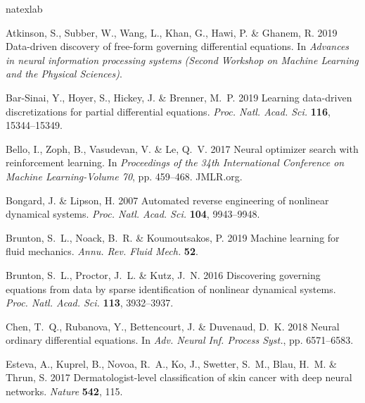 \documentclass{article}
\begin{document}
\begin{thebibliography}{30}
\expandafter\ifx\csname natexlab\endcsname\relax\def\natexlab#1{#1}\fi

{\sc Atkinson, S., Subber, W., Wang, L., Khan, G., Hawi, P. \& Ghanem, R.} 2019
  Data-driven discovery of free-form governing differential equations. In {\em
  Advances in neural information processing systems (Second Workshop on Machine
  Learning and the Physical Sciences)\/}.

{\sc Bar-Sinai, Y., Hoyer, S., Hickey, J. \& Brenner, M.~P.} 2019 Learning
  data-driven discretizations for partial differential equations. {\em
  Proc. Natl. Acad. Sci.\/} {\bf 116},
  15344--15349.

{\sc Bello, I., Zoph, B., Vasudevan, V. \& Le, Q.~V.} 2017 Neural optimizer
  search with reinforcement learning. In {\em Proceedings of the 34th
  International Conference on Machine Learning-Volume 70\/}, pp. 459--468.
  JMLR.org.

{\sc Bongard, J. \& Lipson, H.} 2007 Automated reverse engineering of nonlinear
  dynamical systems. {\em Proc. Natl. Acad. Sci.\/}
  {\bf 104}, 9943--9948.

{\sc Brunton, S.~L., Noack, B.~R. \& Koumoutsakos, P.} 2019 Machine learning
  for fluid mechanics. {\em Annu. Rev. Fluid Mech.\/} {\bf 52}.

{\sc Brunton, S.~L., Proctor, J.~L. \& Kutz, J.~N.} 2016 Discovering governing
  equations from data by sparse identification of nonlinear dynamical systems.
  {\em Proc. Natl. Acad. Sci.\/} {\bf 113},
  3932--3937.

{\sc Chen, T.~Q., Rubanova, Y., Bettencourt, J. \& Duvenaud, D.~K.} 2018 Neural
  ordinary differential equations. In {\em Adv. Neural Inf. Process Syst.\/}, pp. 6571--6583.

{\sc Esteva, A., Kuprel, B., Novoa, R.~A., Ko, J., Swetter, S.~M., Blau, H.~M.
  \& Thrun, S.} 2017 Dermatologist-level classification of skin cancer with
  deep neural networks. {\em Nature\/} {\bf 542}, 115.


\end{thebibliography}
\end{document}
